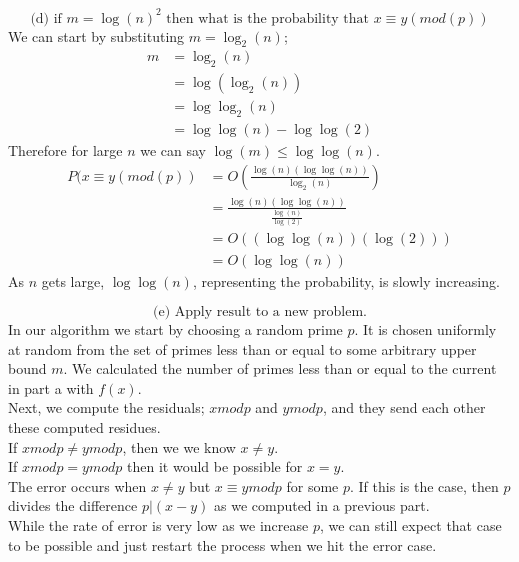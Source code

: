 \documentclass{article}
\begin{document}
\begin{enumerate}
\[
\text{(d) if } m = \log(n)^{2} \text{ then what is the probability that } x \equiv y (mod(p))
\]
We can start by substituting $m = \log_{2}(n)$; \\
\begin{align*}
    m & = \log_{2}(n) \\ 
    & = \log(\log_{2}(n)) \\
    & = \log\log_{2}(n) \\
    & = \log\log(n) - \log\log(2)
\end{align*}
Therefore for large $n$ we can say $\log(m) \leq \log\log(n)$.
\begin{align*}
    P(x \equiv y (mod(p)) & = O(\frac{\log(n)(\log\log(n))}{\log_{2}(n)}) \\
    & = \frac{\log(n)(\log\log(n))}{\frac{\log(n)}{\log(2)}} \\
    & = O((\log\log(n))(\log(2))) \\
    & = O(\log\log(n))
\end{align*}
As $n$ gets large, $\log\log(n)$, representing the probability, is slowly increasing.






\[
\text{(e) Apply result to a new problem.}
\]
In our algorithm we start by choosing a random prime $p$. It is chosen uniformly at random from the set of primes less than or equal to some arbitrary upper bound $m$. We calculated the number of primes less than or equal to the current in part a with $f(x)$. \\
\newline 
Next, we compute the residuals; $x mod p$ and $y mod p$, and they send each other these computed residues. \\
\newline 
If $x mod p \neq y mod p$, then we we know $x \neq y$. \\
If $x mod p = y mod p$ then it would be possible for $x = y$. \\
\newline 
The error occurs when $x \neq y$ but $x \equiv y mod p$ for some $p$. If this is the case, then $p$ divides the difference $p | (x-y)$ as we computed in a previous part. \\
While the rate of error is very low as we increase $p$, we can still expect that case to be possible and just restart the process when we hit the error case. 




\end{enumerate}
\end{document}
